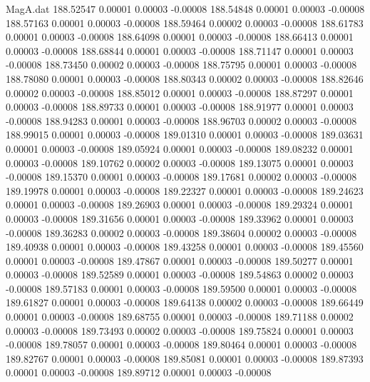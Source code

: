 \begin{filecontents}{MagA.dat}
 188.52547    0.00001    0.00003   -0.00008
 188.54848    0.00001    0.00003   -0.00008
 188.57163    0.00001    0.00003   -0.00008
 188.59464    0.00002    0.00003   -0.00008
 188.61783    0.00001    0.00003   -0.00008
 188.64098    0.00001    0.00003   -0.00008
 188.66413    0.00001    0.00003   -0.00008
 188.68844    0.00001    0.00003   -0.00008
 188.71147    0.00001    0.00003   -0.00008
 188.73450    0.00002    0.00003   -0.00008
 188.75795    0.00001    0.00003   -0.00008
 188.78080    0.00001    0.00003   -0.00008
 188.80343    0.00002    0.00003   -0.00008
 188.82646    0.00002    0.00003   -0.00008
 188.85012    0.00001    0.00003   -0.00008
 188.87297    0.00001    0.00003   -0.00008
 188.89733    0.00001    0.00003   -0.00008
 188.91977    0.00001    0.00003   -0.00008
 188.94283    0.00001    0.00003   -0.00008
 188.96703    0.00002    0.00003   -0.00008
 188.99015    0.00001    0.00003   -0.00008
 189.01310    0.00001    0.00003   -0.00008
 189.03631    0.00001    0.00003   -0.00008
 189.05924    0.00001    0.00003   -0.00008
 189.08232    0.00001    0.00003   -0.00008
 189.10762    0.00002    0.00003   -0.00008
 189.13075    0.00001    0.00003   -0.00008
 189.15370    0.00001    0.00003   -0.00008
 189.17681    0.00002    0.00003   -0.00008
 189.19978    0.00001    0.00003   -0.00008
 189.22327    0.00001    0.00003   -0.00008
 189.24623    0.00001    0.00003   -0.00008
 189.26903    0.00001    0.00003   -0.00008
 189.29324    0.00001    0.00003   -0.00008
 189.31656    0.00001    0.00003   -0.00008
 189.33962    0.00001    0.00003   -0.00008
 189.36283    0.00002    0.00003   -0.00008
 189.38604    0.00002    0.00003   -0.00008
 189.40938    0.00001    0.00003   -0.00008
 189.43258    0.00001    0.00003   -0.00008
 189.45560    0.00001    0.00003   -0.00008
 189.47867    0.00001    0.00003   -0.00008
 189.50277    0.00001    0.00003   -0.00008
 189.52589    0.00001    0.00003   -0.00008
 189.54863    0.00002    0.00003   -0.00008
 189.57183    0.00001    0.00003   -0.00008
 189.59500    0.00001    0.00003   -0.00008
 189.61827    0.00001    0.00003   -0.00008
 189.64138    0.00002    0.00003   -0.00008
 189.66449    0.00001    0.00003   -0.00008
 189.68755    0.00001    0.00003   -0.00008
 189.71188    0.00002    0.00003   -0.00008
 189.73493    0.00002    0.00003   -0.00008
 189.75824    0.00001    0.00003   -0.00008
 189.78057    0.00001    0.00003   -0.00008
 189.80464    0.00001    0.00003   -0.00008
 189.82767    0.00001    0.00003   -0.00008
 189.85081    0.00001    0.00003   -0.00008
 189.87393    0.00001    0.00003   -0.00008
 189.89712    0.00001    0.00003   -0.00008

\end{filecontents}
